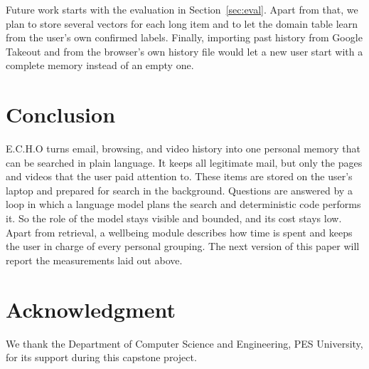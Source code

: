 \documentclass[conference]{IEEEtran}
\begin{document}
Future work starts with the evaluation in Section~\ref{sec:eval}. Apart from that, we plan to store several vectors for each long item and to let the domain table learn from the user's own confirmed labels. Finally, importing past history from Google Takeout and from the browser's own history file would let a new user start with a complete memory instead of an empty one.

\section{Conclusion}\label{sec:conc}
E.C.H.O turns email, browsing, and video history into one personal memory that can be searched in plain language. It keeps all legitimate mail, but only the pages and videos that the user paid attention to. These items are stored on the user's laptop and prepared for search in the background. Questions are answered by a loop in which a language model plans the search and deterministic code performs it. So the role of the model stays visible and bounded, and its cost stays low. Apart from retrieval, a wellbeing module describes how time is spent and keeps the user in charge of every personal grouping. The next version of this paper will report the measurements laid out above.

\section*{Acknowledgment}
We thank the Department of Computer Science and Engineering, PES University, for its support during this capstone project.
\end{document}
